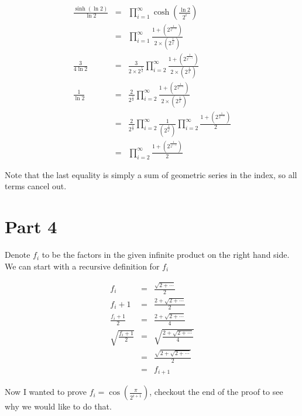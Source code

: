 \documentclass{article}
\begin{document}
\begin{eqnarray*}
  \frac{\sinh(\ln 2)}{\ln 2} &=& \prod\limits_{i = 1}^{\infty} \cosh\left(\frac{\ln 2}{2^i}\right) \\
                             &=& \prod\limits_{i = 1}^{\infty} \frac{1 + \left(2^{\frac{1}{2^{i-1}}}\right)}{2 \times \left(2^{\frac{1}{2^i}}\right)} \\
            \frac{3}{4\ln 2} &=& \frac{3}{2 \times 2^{\frac{1}{2}}} \prod\limits_{i = 2}^{\infty} \frac{1 + \left(2^{\frac{1}{2^{i-1}}}\right)}{2 \times \left(2^{\frac{1}{2^i}}\right)} \\
             \frac{1}{\ln 2} &=& \frac{2}{2^{\frac{1}{2}}} \prod\limits_{i = 2}^{\infty} \frac{1 + \left(2^{\frac{1}{2^{i-1}}}\right)}{2 \times \left(2^{\frac{1}{2^i}}\right)} \\
                             &=& \frac{2}{2^{\frac{1}{2}}} \prod\limits_{i = 2}^{\infty} \frac{1}{\left(2^{\frac{1}{2^i}}\right)} \prod\limits_{i = 2}^{\infty} \frac{1 + \left(2^{\frac{1}{2^{i-1}}}\right)}{2} \\
                             &=& \prod\limits_{i = 2}^{\infty} \frac{1 + \left(2^{\frac{1}{2^{i-1}}}\right)}{2} 
\end{eqnarray*}

Note that the last equality is simply a sum of geometric series in the index, so all terms cancel out.

\section*{Part 4}
Denote $ f_i $ to be the factors in the given infinite product on the right hand side. We can start with a recursive definition for $ f_i $

\begin{eqnarray*}
  f_i &=& \frac{\sqrt{2 + \cdots}}{2} \\
  f_i + 1 &=& \frac{2 + \sqrt{2 + \cdots}}{2} \\
  \frac{f_i + 1}{2} &=& \frac{2 + \sqrt{2 + \cdots}}{4} \\
  \sqrt{\frac{f_i + 1}{2}} &=& \sqrt{\frac{2 + \sqrt{2 + \cdots}}{4}} \\
                           &=& \frac{\sqrt{2 + \sqrt{2 + \cdots}}}{2} \\
                           &=& f_{i + 1}
\end{eqnarray*}

Now I wanted to prove $ f_i = \cos\left(\frac{\pi}{2^{i+1}}\right) $, checkout the end of the proof to see why we would like to do that.
\end{document}
